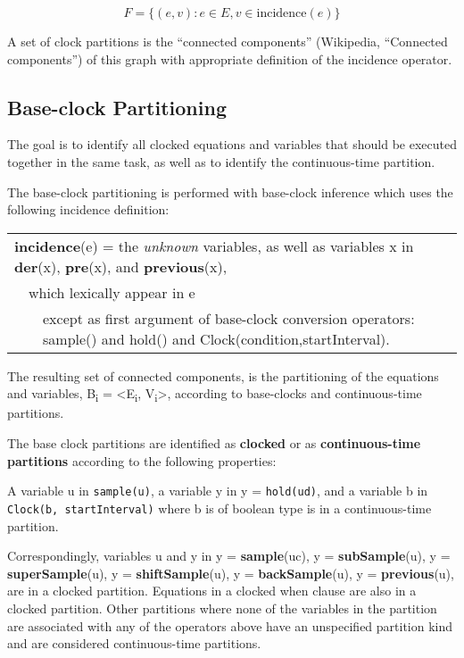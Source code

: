 $$F = \{(e, v) : e \in E , v \in \text{incidence}(e)\}$$

A set of clock partitions is the ``connected components'' (Wikipedia,
``Connected components'') of this graph with appropriate definition of
the incidence operator.

\subsection{Base-clock Partitioning}

The goal is to identify all clocked equations and variables that should
be executed together in the same task, as well as to identify the
continuous-time partition.

The base-clock partitioning is performed with base-clock inference which
uses the following incidence definition:

\begin{tabular}{p{1cm}p{1cm}p{1cm}p{12cm}}
\multicolumn{4}{p{15cm}}{\textbf{incidence}(e) = the \emph{unknown} variables, as well as
variables x in \textbf{der}(x), \textbf{pre}(x), and \textbf{previous}(x),}\\
&\multicolumn{3}{p{14cm}}{which lexically appear in e}\\
&&\multicolumn{2}{p{13cm}}{except as first argument of base-clock conversion operators: sample() and hold() and Clock(condition,startInterval).}
\end{tabular}

The resulting set of connected components, is the partitioning of the
equations and variables, B\textsubscript{i} =
\textless{}E\textsubscript{i}, V\textsubscript{i}\textgreater{},
according to base-clocks and continuous-time partitions.

The base clock partitions are identified as \textbf{clocked} or as
\textbf{continuous-time partitions} according to the following
properties:

A variable u in \lstinline!sample(u)!, a variable y in y =
\lstinline!hold(ud)!, and a variable b in \lstinline!Clock(b, startInterval)! where b is of boolean type is in a continuous-time partition.

Correspondingly, variables u and y in y = \textbf{sample}(uc), y =
\textbf{subSample}(u), y = \textbf{superSample}(u), y =
\textbf{shiftSample}(u), y = \textbf{backSample}(u), y =
\textbf{previous}(u), are in a clocked partition. Equations in a clocked
when clause are also in a clocked partition.
Other partitions where none of the variables in the partition are
associated with any of the operators above have an unspecified partition
kind and are considered continuous-time partitions.

